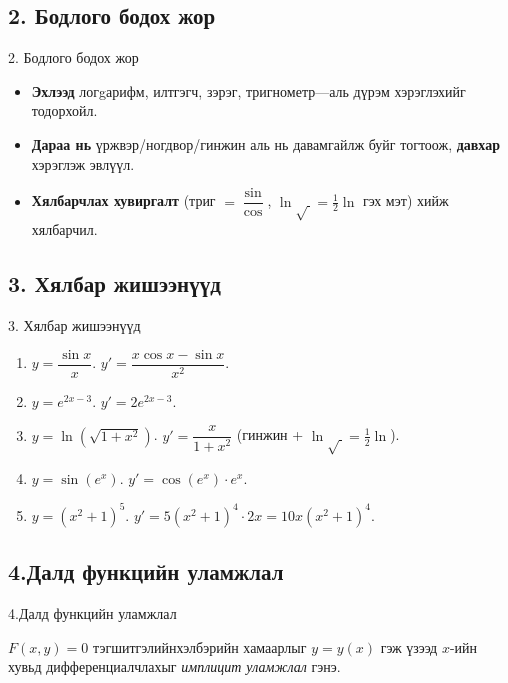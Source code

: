 \subsection*{2. Бодлого бодох жор}
\begin{frame}[allowframebreaks]{2. Бодлого бодох жор}
\begin{itemize}
  \item \textbf{Эхлээд} логgарифм, илтгэгч, зэрэг, тригнометр—аль дүрэм хэрэглэхийг тодорхойл.
  \item \textbf{Дараа нь} үржвэр/ногдвор/гинжин аль нь давамгайлж буйг тогтоож, \textbf{давхар} хэрэглэж эвлүүл.
  \item \textbf{Хялбарчлах хувиргалт} (триг $=\dfrac{\sin}{\cos}$, $\ln\sqrt{\ }=\tfrac12\ln$ гэх мэт) хийж хялбарчил.
\end{itemize}
\end{frame}

\subsection*{3. Хялбар жишээнүүд}
\begin{frame}[allowframebreaks]{3. Хялбар жишээнүүд}
\begin{example}
\begin{enumerate}
  \item $y=\dfrac{\sin x}{x}$.\; $y'=\dfrac{x\cos x-\sin x}{x^2}$.
  \item $y=e^{2x-3}$.\; $y'=2e^{2x-3}$.
  \item $y=\ln(\sqrt{1+x^2})$.\; $y'=\dfrac{x}{1+x^2}$ \; (гинжин + $\ln\sqrt{\ }=\tfrac12\ln$).
  \item $y=\sin(e^x)$.\; $y'=\cos(e^x)\cdot e^x$.
  \item $y=(x^2+1)^{5}$.\; $y'=5(x^2+1)^{4}\cdot 2x=10x(x^2+1)^4$.
\end{enumerate}
\end{example}
\end{frame}

\subsection*{4.Далд функцийн уламжлал}
\begin{frame}[allowframebreaks]{4.Далд функцийн уламжлал}
\begin{definition}
$F(x,y)=0$ тэгшитгэлийнхэлбэрийн хамаарлыг $y=y(x)$ гэж үзээд $x$-ийн хувьд дифференциалчлахыг \emph{имплицит уламжлал} гэнэ.
\end{definition}
\end{frame}

